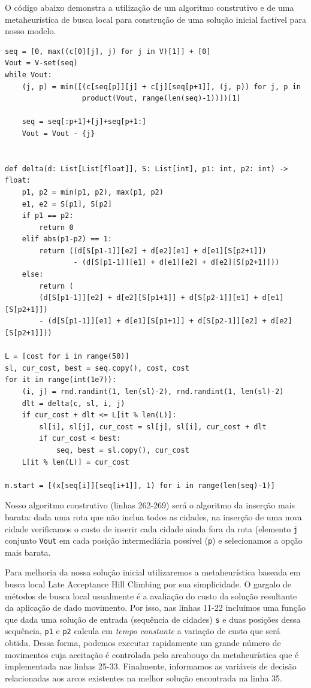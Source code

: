 \documentclass[a4paper,11pt,fleqn]{article}
\begin{document}
O código abaixo demonstra a utilização de um algoritmo construtivo e de uma metaheurística de busca local para construção de uma solução inicial factível para nosso modelo.
 
{\small
\begin{lstlisting}
seq = [0, max((c[0][j], j) for j in V)[1]] + [0]
Vout = V-set(seq)
while Vout:
    (j, p) = min([(c[seq[p]][j] + c[j][seq[p+1]], (j, p)) for j, p in
                  product(Vout, range(len(seq)-1))])[1]

    seq = seq[:p+1]+[j]+seq[p+1:]    
    Vout = Vout - {j}


def delta(d: List[List[float]], S: List[int], p1: int, p2: int) -> float:
    p1, p2 = min(p1, p2), max(p1, p2)
    e1, e2 = S[p1], S[p2]
    if p1 == p2:
        return 0
    elif abs(p1-p2) == 1:
        return ((d[S[p1-1]][e2] + d[e2][e1] + d[e1][S[p2+1]])
                - (d[S[p1-1]][e1] + d[e1][e2] + d[e2][S[p2+1]]))
    else:
        return (
        (d[S[p1-1]][e2] + d[e2][S[p1+1]] + d[S[p2-1]][e1] + d[e1][S[p2+1]])
        - (d[S[p1-1]][e1] + d[e1][S[p1+1]] + d[S[p2-1]][e2] + d[e2][S[p2+1]]))

L = [cost for i in range(50)]
sl, cur_cost, best = seq.copy(), cost, cost
for it in range(int(1e7)):
    (i, j) = rnd.randint(1, len(sl)-2), rnd.randint(1, len(sl)-2)
    dlt = delta(c, sl, i, j)
    if cur_cost + dlt <= L[it % len(L)]:
        sl[i], sl[j], cur_cost = sl[j], sl[i], cur_cost + dlt
        if cur_cost < best:
            seq, best = sl.copy(), cur_cost
    L[it % len(L)] = cur_cost
    
m.start = [(x[seq[i]][seq[i+1]], 1) for i in range(len(seq)-1)]    
\end{lstlisting}}

Nosso algoritmo construtivo (linhas 262-269) será o algoritmo da inserção mais barata: dada uma rota que não inclua todos as cidades, na inserção de uma nova cidade verificamos o custo de inserir cada cidade ainda fora da rota (elemento \texttt{j} conjunto \texttt{Vout} em cada posição intermediária possível (\texttt{p}) e selecionamos a opção mais barata.

Para melhoria da nossa solução inicial utilizaremos a metaheurística baseada em busca local Late Acceptance Hill Climbing \citep{burke2017} por sua simplicidade. O gargalo de métodos de busca local usualmente é a avaliação do custo da solução resultante da aplicação de dado movimento. Por isso, nas linhas 11-22 incluímos uma função que dada uma solução de entrada (sequência de cidades) \texttt{s} e duas posições dessa sequência, \texttt{p1} e \texttt{p2} calcula em \emph{tempo constante} a variação de custo que será obtida. Dessa forma, podemos executar rapidamente um grande número de movimentos cuja aceitação é controlada pelo arcabouço da metaheurística que é implementada nas linhas 25-33. Finalmente, informamos as variáveis de decisão relacionadas aos arcos existentes na melhor solução encontrada na linha 35.


		


\end{document}
